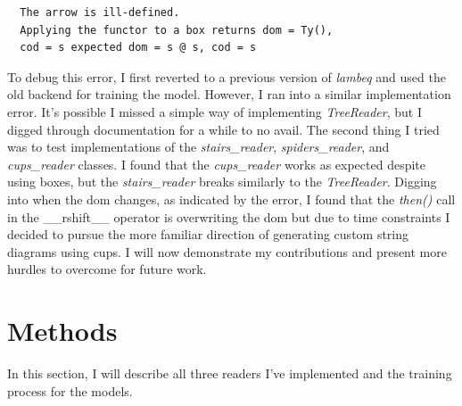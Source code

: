 \documentclass[12pt ]{article}
\begin{document}
\begin{verbatim}
  The arrow is ill-defined.
  Applying the functor to a box returns dom = Ty(),
  cod = s expected dom = s @ s, cod = s
\end{verbatim}
To debug this error, I first reverted to a previous version of {\it lambeq} and used the old backend for training the model. However, I ran into a similar implementation error. It's possible I missed a simple way of implementing {\it TreeReader}, but I digged through documentation for a while to no avail. The second thing I tried was to test implementations of the {\it stairs\_reader}, {\it spiders\_reader}, and {\it cups\_reader} classes. I found that the {\it cups\_reader}  works as expected despite using boxes, but the {\it stairs\_reader} breaks similarly to the {\it TreeReader}. Digging into when the dom changes, as indicated by the error, I found that the {\it then()} call in the \_\_rshift\_\_ operator is overwriting the dom but due to time constraints I decided to pursue the more familiar direction of generating custom string diagrams using cups. I will now demonstrate my contributions and present more hurdles to overcome for future work. 


\section{Methods}
In this section, I will describe all three readers I've implemented and the training process for the models.
\end{document}
